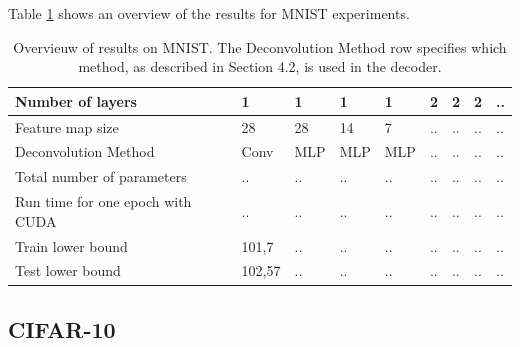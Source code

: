 Table \ref{overview} shows an overview of the results for MNIST experiments. 
\begin{table}
\caption{Overvieuw of results on MNIST. The Deconvolution Method row specifies which method, as described in Section 4.2, is used in the decoder.}
\renewcommand{\arraystretch}{1.5}
\label{overview}
\begin{tabular}{| l | l | l | l | l | l | l | l | l |}

	\hline
  Number of layers & 1 & 1 & 1 & 1 & 2 & 2 & 2 & .. \\ \hline
  Feature map size & 28 & 28 & 14 & 7 & .. & .. & .. & .. \\ \hline
  Deconvolution Method & Conv & MLP & MLP & MLP & .. & .. & .. & .. \\ \hline
  Total number of parameters & .. & .. & .. & .. & .. & .. & .. & .. \\ \hline
  Run time for one epoch with CUDA & .. & .. & .. & .. & .. & .. & .. & .. \\ \hline
  Train lower bound & 101,7 & .. & .. & .. & .. & .. & .. & .. \\ \hline
  Test lower bound & 102,57 & .. & .. & .. & .. & .. & .. & .. \\ \hline
\end{tabular}
\end{table}


\subsection{CIFAR-10}






